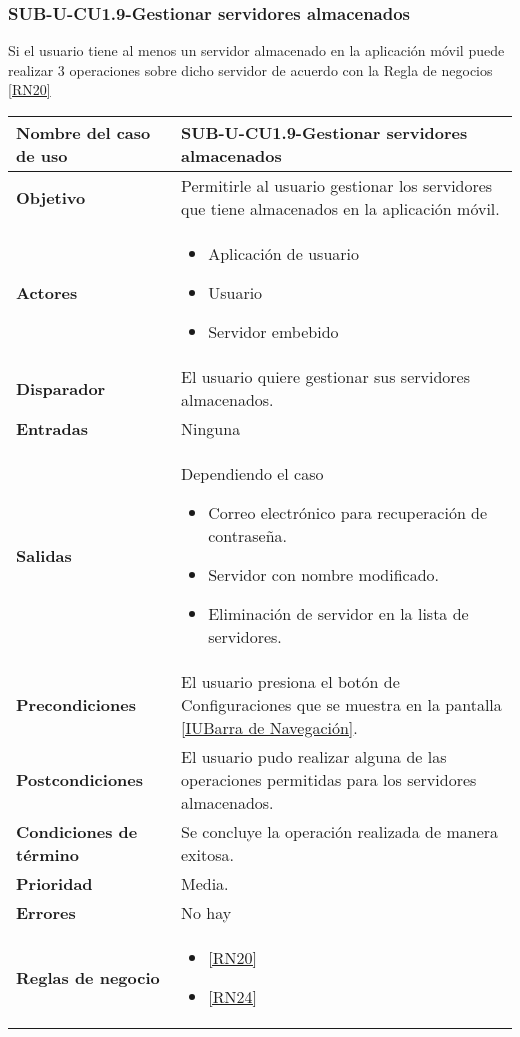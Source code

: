\subsubsection{SUB-U-CU1.9-Gestionar servidores almacenados}\label{SUB-U-CU1.9}
Si el usuario tiene al menos un servidor almacenado en la aplicación móvil puede realizar 3 operaciones sobre dicho servidor de acuerdo con la Regla de negocios \ref{RN20}
\begin{longtable}{|J{5cm}|J{10.3cm}|}
	\hline
	\textbf{Nombre del caso de uso} &
		SUB-U-CU1.9-Gestionar servidores almacenados \\ \hline
	\textbf{Objetivo} &
		Permitirle al usuario gestionar los servidores que tiene almacenados en la aplicación móvil. \\ \hline
	\textbf{Actores} &
	    \begin{itemize}
			\item Aplicación de usuario
			\item Usuario
			\item Servidor embebido
		\end{itemize}\\ \hline 
	\textbf{Disparador} & 
		El usuario quiere gestionar sus servidores almacenados.\\ \hline 
	\textbf{Entradas} & 
		Ninguna \\ \hline
	\textbf{Salidas} & 
	    Dependiendo el caso
		\begin{itemize}
		    \item Correo electrónico para recuperación de contraseña.
			\item Servidor con nombre modificado.
			\item Eliminación de servidor en la lista de servidores.
		\end{itemize}
		 \\ \hline
	\textbf{Precondiciones} &
		El usuario presiona el botón de Configuraciones que se muestra en la pantalla \hyperref[fig:Barra de navegacion]{[IUBarra de Navegación]}.\\ \hline 
	\textbf{Postcondiciones} &
		El usuario pudo realizar alguna de las operaciones permitidas para los servidores almacenados.\\ \hline 
	\textbf{Condiciones de término} & 
		Se concluye la operación realizada de manera exitosa. \\ \hline
	\textbf{Prioridad} & 
		Media. \\ \hline
	\textbf{Errores} & 
		No hay \\ \hline
	\textbf{Reglas de negocio} & 
	    \begin{itemize}
		    \item \ref{RN20}
		    \item \ref{RN24}
		\end{itemize} \\ \hline
\end{longtable}

